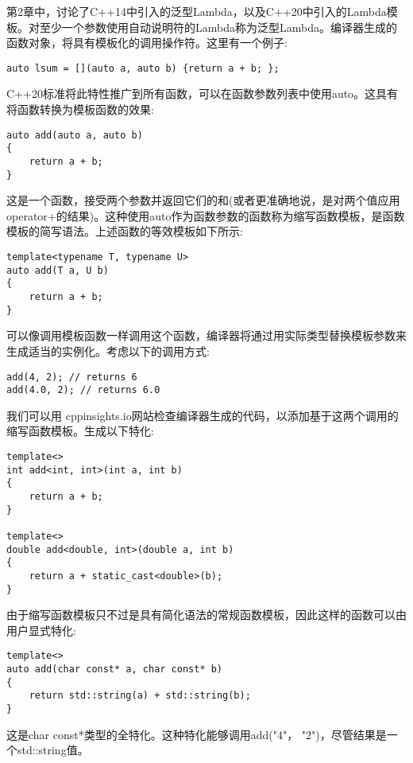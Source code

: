 第2章中，讨论了C++14中引入的泛型Lambda，以及C++20中引入的Lambda模板。对至少一个参数使用自动说明符的Lambda称为泛型Lambda。编译器生成的函数对象，将具有模板化的调用操作符。这里有一个例子:

\begin{lstlisting}[style=styleCXX]
auto lsum = [](auto a, auto b) {return a + b; };
\end{lstlisting}

C++20标准将此特性推广到所有函数，可以在函数参数列表中使用auto。这具有将函数转换为模板函数的效果:

\begin{lstlisting}[style=styleCXX]
auto add(auto a, auto b)
{
	return a + b;
}
\end{lstlisting}

这是一个函数，接受两个参数并返回它们的和(或者更准确地说，是对两个值应用operator+的结果)。这种使用auto作为函数参数的函数称为缩写函数模板，是函数模板的简写语法。上述函数的等效模板如下所示:

\begin{lstlisting}[style=styleCXX]
template<typename T, typename U>
auto add(T a, U b)
{
	return a + b;
}
\end{lstlisting}

可以像调用模板函数一样调用这个函数，编译器将通过用实际类型替换模板参数来生成适当的实例化。考虑以下的调用方式:

\begin{lstlisting}[style=styleCXX]
add(4, 2); // returns 6
add(4.0, 2); // returns 6.0
\end{lstlisting}

我们可以用 cppinsights.io网站检查编译器生成的代码，以添加基于这两个调用的缩写函数模板。生成以下特化:

\begin{lstlisting}[style=styleCXX]
template<>
int add<int, int>(int a, int b)
{
	return a + b;
}

template<>
double add<double, int>(double a, int b)
{
	return a + static_cast<double>(b);
}
\end{lstlisting}

由于缩写函数模板只不过是具有简化语法的常规函数模板，因此这样的函数可以由用户显式特化:

\begin{lstlisting}[style=styleCXX]
template<>
auto add(char const* a, char const* b)
{
	return std::string(a) + std::string(b);
}
\end{lstlisting}

这是char const*类型的全特化。这种特化能够调用add("4"， "2")，尽管结果是一个std::string值。

